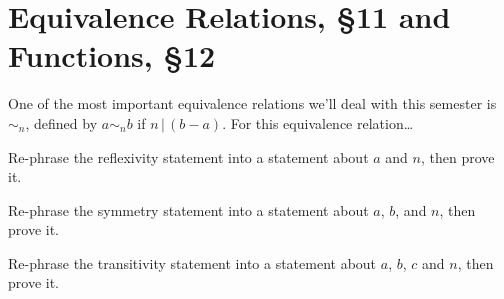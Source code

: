 
%

\section{{Equivalence Relations,  \framebox\S 11} and Functions, \framebox\S 12 }


%
\thispagestyle{fancy}

\begin{center}
\end{center}
\bigskip

\begin{enumerate}
  \Problem One of the most important equivalence relations we'll deal
  with this semester is $\sim_{n}$, defined by $a \sim_n b$ if
  $n\,|\,(b-a)$. For this equivalence relation\ldots
  \begin{enumerate}
    \Part Re-phrase the reflexivity statement into a statement about
    $a$ and $n$, then prove it.
    \vfill

    \Part Re-phrase the symmetry statement into a statement about
    $a$, $b$, and $n$, then prove it.
    \vfill

    \Part Re-phrase the transitivity statement into a statement about
    $a$, $b$, $c$ and $n$, then prove it.
    \vfill

  \end{enumerate}

\end{enumerate}


\newpage


